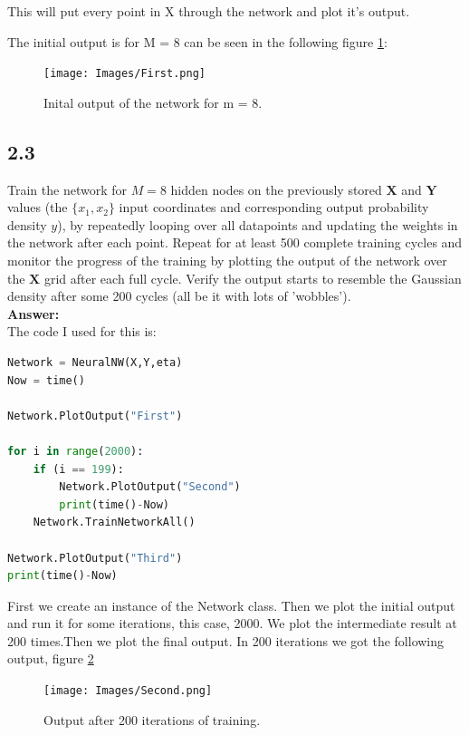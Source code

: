 \documentclass[a4paper]{article}
\begin{document}
This will put every point in X through the network and plot it's output. 


The initial output is for M = 8 can be seen in the following figure \ref{First}:

\begin{figure}[H]
\texttt{[image: Images/First.png]}
\caption{Inital output of the network for m = 8.}
\label{First}
\end{figure}






\subsection*{2.3}

Train the network for $M = 8$ hidden nodes on the previously stored $\textbf{X}$ and $\textbf{Y}$ values (the $\{ x_1, x_2 \}$ input coordinates and corresponding output probability density $y$), by repeatedly looping over all datapoints and updating the weights in the network after each point. Repeat for at least 500 complete training cycles and monitor the progress of the training by plotting the output of the network over the $\textbf{X}$ grid after each full cycle. Verify the output starts to resemble the Gaussian density after some 200 cycles (all be it with lots of 'wobbles').\\


\textbf{Answer:}\\


The code I used for this is:


\begin{lstlisting}[language=Python]
Network = NeuralNW(X,Y,eta)
Now = time()

Network.PlotOutput("First")

for i in range(2000):
    if (i == 199):
        Network.PlotOutput("Second")
        print(time()-Now)
    Network.TrainNetworkAll()

Network.PlotOutput("Third")
print(time()-Now)
\end{lstlisting}

First we create an instance of the Network class. Then we plot the initial output and run it for some iterations, this case, 2000. We plot the intermediate result at 200 times.Then we plot the final output. In 200 iterations we got the following output, figure \ref{Second}

\begin{figure}[H]
\texttt{[image: Images/Second.png]}
\caption{Output after 200 iterations of training.}
\label{Second}
\end{figure}
\end{document}

